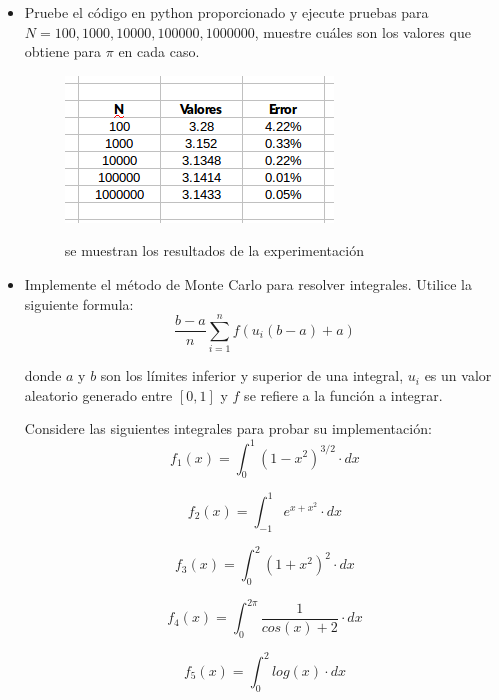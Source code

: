 \documentclass[runningheads,a4paper]{llncs}
\begin{document}
\begin{itemize}
\item Pruebe el  c\'odigo en python proporcionado y ejecute pruebas para $N = 100, 1000, 10000, 100000, 1000000$, muestre cu\'ales son los valores que obtiene para $\pi$ en cada caso.

\begin{figure}[H]
\centering
\includegraphics[scale=0.6]{tabla.png}
\label{fig:tabla Resultados}
\caption{se muestran los resultados de la experimentación}
\end{figure}

\item Implemente el m\'etodo de Monte Carlo para resolver integrales.
Utilice la siguiente formula:
\begin{equation}
\frac{b-a}{n} \sum_{i = 1}^{n}f(u_i(b-a) + a)
\end{equation}

donde $a$ y $b$ son los l\'imites inferior y superior de una integral, $u_i$ es un valor aleatorio generado entre $[0,1]$ y $f$ se refiere a la funci\'on a integrar.

Considere las siguientes integrales para probar su implementaci\'on:
\begin{equation}
f_1(x) = \int_{0}^{1} (1-x^2)^{3/2} \cdot dx
\end{equation}

\begin{equation}
f_2(x) = \int_{-1}^{1} e^{x+x^2} \cdot dx
\end{equation}

\begin{equation}
f_3(x) = \int_{0}^{2} (1+x^2)^2 \cdot dx
\end{equation}

\begin{equation}
f_4(x) = \int_{0}^{2\pi} \frac{1}{cos(x)+2} \cdot dx
\end{equation}

\begin{equation}
f_5(x) = \int_{0}^{2} log(x) \cdot dx
\end{equation}
\end{itemize}
\end{document}
